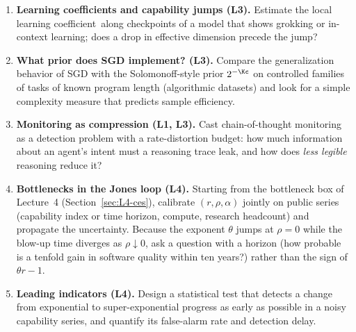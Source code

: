 \begin{enumerate}
  \item \textbf{Learning coefficients and capability jumps (L3).} Estimate the local learning coefficient\,\citep{lau2023} along checkpoints of a model that shows grokking or in-context learning; does a drop in effective dimension precede the jump?
  \item \textbf{What prior does SGD implement? (L3).} Compare the generalization behavior of SGD with the Solomonoff-style prior $2^{-\Kc}$ on controlled families of tasks of known program length (algorithmic datasets) and look for a simple complexity measure that predicts sample efficiency.
  \item \textbf{Monitoring as compression (L1, L3).} Cast chain-of-thought monitoring as a detection problem with a rate-distortion budget: how much information about an agent's intent must a reasoning trace leak, and how does \emph{less legible} reasoning reduce it?
  \item \textbf{Bottlenecks in the Jones loop (L4).} Starting from the bottleneck box of Lecture~4 (Section~\ref{sec:L4-ces}), calibrate $(r,\rho,\alpha)$ jointly on public series (capability index or time horizon, compute, research headcount) and propagate the uncertainty. Because the exponent $\theta$ jumps at $\rho=0$ while the blow-up time diverges as $\rho\downarrow0$, ask a question with a horizon (how probable is a tenfold gain in software quality within ten years?) rather than the sign of $\theta r-1$.
  \item \textbf{Leading indicators (L4).} Design a statistical test that detects a change from exponential to super-exponential progress as early as possible in a noisy capability series, and quantify its false-alarm rate and detection delay.
\end{enumerate}
